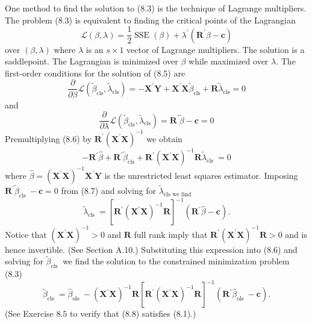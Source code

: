 \documentclass[10pt]{article}
\begin{document}
One method to find the solution to (8.3) is the technique of Lagrange multipliers. The problem (8.3) is equivalent to finding the critical points of the Lagrangian
$$
\mathscr{L}(\beta, \lambda)=\frac{1}{2} \operatorname{SSE}(\beta)+\lambda^{\prime}\left(\boldsymbol{R}^{\prime} \beta-\boldsymbol{c}\right)
$$
over $(\beta, \lambda)$ where $\lambda$ is an $s \times 1$ vector of Lagrange multipliers. The solution is a saddlepoint. The Lagrangian is minimized over $\beta$ while maximized over $\lambda$. The first-order conditions for the solution of (8.5) are
$$
\frac{\partial}{\partial \beta} \mathscr{L}\left(\widetilde{\beta}_{\mathrm{cls}}, \widetilde{\lambda}_{\mathrm{cls}}\right)=-\boldsymbol{X}^{\prime} \boldsymbol{Y}+\boldsymbol{X}^{\prime} \boldsymbol{X} \widetilde{\beta}_{\mathrm{cls}}+\boldsymbol{R} \widetilde{\lambda}_{\mathrm{cls}}=0
$$
and
$$
\frac{\partial}{\partial \lambda} \mathscr{L}\left(\widetilde{\beta}_{\mathrm{cls}}, \widetilde{\lambda}_{\mathrm{cls}}\right)=\boldsymbol{R}^{\prime} \widetilde{\beta}-\boldsymbol{c}=0
$$
Premultiplying (8.6) by $\boldsymbol{R}^{\prime}\left(\boldsymbol{X}^{\prime} \boldsymbol{X}\right)^{-1}$ we obtain
$$
-\boldsymbol{R}^{\prime} \widehat{\beta}+\boldsymbol{R}^{\prime} \widetilde{\beta}_{\mathrm{cls}}+\boldsymbol{R}^{\prime}\left(\boldsymbol{X}^{\prime} \boldsymbol{X}\right)^{-1} \boldsymbol{R} \tilde{\lambda}_{\text {cls }}=0
$$
where $\widehat{\beta}=\left(\boldsymbol{X}^{\prime} \boldsymbol{X}\right)^{-1} \boldsymbol{X}^{\prime} \boldsymbol{Y}$ is the unrestricted least squares estimator. Imposing $\boldsymbol{R}^{\prime} \widetilde{\beta}_{\text {cls }}-\boldsymbol{c}=0$ from (8.7) and solving for $\widetilde{\lambda}_{\text {cls we find }}$
$$
\tilde{\lambda}_{\text {cls }}=\left[\boldsymbol{R}^{\prime}\left(\boldsymbol{X}^{\prime} \boldsymbol{X}\right)^{-1} \boldsymbol{R}\right]^{-1}\left(\boldsymbol{R}^{\prime} \widehat{\beta}-\boldsymbol{c}\right) .
$$
Notice that $\left(\boldsymbol{X}^{\prime} \boldsymbol{X}\right)^{-1}>0$ and $\boldsymbol{R}$ full rank imply that $\boldsymbol{R}^{\prime}\left(\boldsymbol{X}^{\prime} \boldsymbol{X}\right)^{-1} \boldsymbol{R}>0$ and is hence invertible. (See Section A.10.) Substituting this expression into (8.6) and solving for $\widetilde{\beta}_{\text {cls }}$ we find the solution to the constrained minimization problem (8.3)
$$
\widetilde{\beta}_{\text {cls }}=\widehat{\beta}_{\text {ols }}-\left(\boldsymbol{X}^{\prime} \boldsymbol{X}\right)^{-1} \boldsymbol{R}\left[\boldsymbol{R}^{\prime}\left(\boldsymbol{X}^{\prime} \boldsymbol{X}\right)^{-1} \boldsymbol{R}\right]^{-1}\left(\boldsymbol{R}^{\prime} \widehat{\beta}_{\text {ols }}-\boldsymbol{c}\right) .
$$
(See Exercise $8.5$ to verify that (8.8) satisfies (8.1).)
\end{document}
